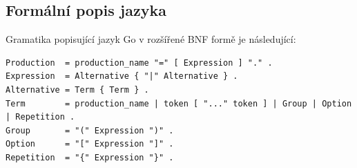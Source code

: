 \documentclass[12pt, a4paper]{article}
\begin{document}
\subsection{Formální popis jazyka}
Gramatika popisující jazyk Go v rozšířené BNF formě je následující:

\begin{lstlisting}
Production  = production_name "=" [ Expression ] "." .
Expression  = Alternative { "|" Alternative } .
Alternative = Term { Term } .
Term        = production_name | token [ "..." token ] | Group | Option | Repetition .
Group       = "(" Expression ")" .
Option      = "[" Expression "]" .
Repetition  = "{" Expression "}" .

\end{lstlisting}
\end{document}
